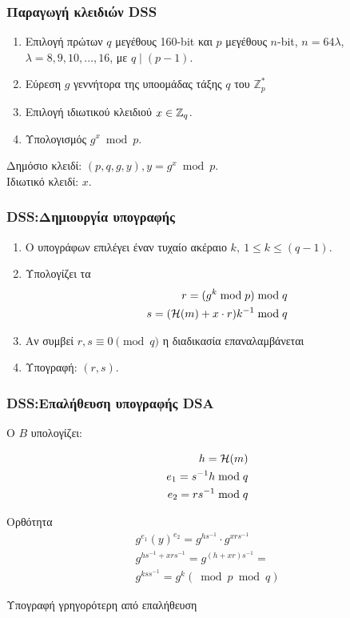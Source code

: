 \documentclass[handout]{beamer}
\begin{document}
\begin{frame}
\frametitle{Παραγωγή κλειδιών DSS}

\begin{block}{}
\begin{enumerate}
\item Επιλογή πρώτων $q$ μεγέθους 160-bit και $p$ μεγέθους $n$-bit, $n=64{\lambda}$, $\lambda=8,9,10,\ldots,16$, με $q \mid (p-1)$.\pause
\item Εύρεση $g$ γεννήτορα της υποομάδας τάξης $q$ του $\mathbb{Z}_p^*$ \pause
\item Επιλογή ιδιωτικού κλειδιού $x \in \mathbb{Z}_q$.\pause
\item Υπολογισμός $g^x \bmod{p}$. 
\end{enumerate}
\pause
\begin{flushleft}
Δημόσιο κλειδί: $(p,q,g,y), y = g^x \bmod p$.\\
Ιδιωτικό κλειδί: $x$.
\end{flushleft}
\end{block}

\end{frame}


\begin{frame} \frametitle{DSS:Δημιουργία υπογραφής}

\begin{block}{}
\begin{enumerate}
\item Ο υπογράφων επιλέγει έναν τυχαίο ακέραιο $k,\ 1 \leq k \leq (q-1)$.\pause
\item Υπολογίζει τα \pause
\begin{align*}
r  =   (g^k \bmod{p}) \bmod{q}  \\
s  =   (\mathcal{H}(m)+ x \cdot r)k^{-1}\bmod{q}
\end{align*} 
\item Αν συμβεί $r,s \equiv 0\pmod{q}$ η διαδικασία επαναλαμβάνεται \pause
\item Υπογραφή: $(r,s)$.
\end{enumerate}
\end{block}
\end{frame}


\begin{frame}\frametitle{DSS:Επαλήθευση υπογραφής DSA}
Ο $B$ υπολογίζει:

\begin{align*}
h=\mathcal{H}(m) \\
e_1  =   s^{-1} h \bmod{q} \\
e_2  =   rs^{-1}  \bmod{q} 
\end{align*}		 
\pause
{}
\pause
\begin{block}{Ορθότητα}
\begin{align*}
g^{e_1}(y)^{e_2}  = 
g^{hs^{-1}} \cdot g^{xrs^{-1}}  \\
g^{hs^{-1}+xrs^{-1}}  = 
g^{(h+xr)s^{-1}} = \\
g^{kss^{-1}} = 
g^{k} (\bmod{p} \bmod{q})
\end{align*}
\end{block}
\pause
\alert{Υπογραφή γρηγορότερη από επαλήθευση}
\end{frame}
\end{document}
